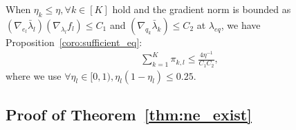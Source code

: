When $\eta_k \leq \eta, \forall k \in [K]$ hold and the gradient norm is bounded as $(\nabla_{e_l} \bar{\lambda}_l)(\nabla_{\lambda_l} f_l) \leq C_1$ and $(\nabla_{q_k} \bar{\lambda}_k) \leq C_2$ at $\lambda_{eq}$, we have Proposition~\ref{coro:sufficient_eq}:
\begin{align*}
    \sum_{k=1}^{K} \pi_{k,l} \leq \frac{4 \eta^{-1}}{C_1 C_2},
\end{align*}
where we use $\forall \eta_l \in [0, 1), \eta_l(1- \eta_l) \leq 0.25$.

\vspace{3mm}

\subsection{Proof of Theorem~\ref{thm:ne_exist}}\label{app:exist_eq}

